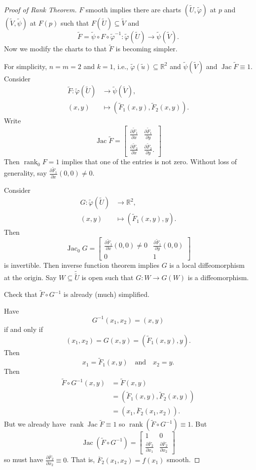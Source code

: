 \documentclass[12pt]{article}
\theoremstyle{definition}
\newcommand{\isp}[1]{\quad\text{#1}\quad}
\newcommand{\R}{\mathbb{R}}
\renewcommand{\phi}{\varphi}
\newcommand{\<}{\left\langle}
\renewcommand{\>}{\right\rangle}
\newcommand{\seq}{\subseteq}
\newcommand{\To}{\longrightarrow}
\newcommand{\Mapsto}{\longmapsto}
\DeclareMathOperator{\rank}{rank}
\DeclareMathOperator{\Jac}{Jac}
\newcommand{\pdv}[2]{\frac{\partial #1}{\partial #2}}
\newcommand{\mat}[1]{\begin{bmatrix}#1\end{bmatrix}}
\renewcommand{\tilde}{\widetilde}
\begin{document}
\begin{proof}[Proof of Rank Theorem]
    $F$ smooth implies there are charts $(\tilde{U}, \tilde{\phi})$ at $p$ and $(\tilde{V}, \tilde{\psi})$ at $F(p)$ such that $F(\tilde{U}) \seq \tilde{V}$ and
    \[
        \tilde{F} = \tilde{\psi} \circ F \circ \tilde{\phi}^{-1} : \tilde{\phi}(\tilde{U}) \To \tilde{\psi}(\tilde{V}).
    \]
    Now we modify the charts to that $\tilde{F}$ is becoming simpler.

    For simplicity, $n = m = 2$ and $k = 1$, i.e., $\tilde{\phi}(\tilde{u}) \seq \R^2$ and $\tilde{\psi}(\tilde{V})$ and $\Jac\tilde{F} \equiv 1$.
    Consider
    \begin{align*}
        \tilde{F} : \tilde{\phi}(\tilde{U}) &\To \tilde{\psi}(\tilde{V}), \\
            (x, y) &\Mapsto (\tilde{F}_1(x, y), \tilde{F}_2(x, y)).
    \end{align*}
    Write
    \[
        \Jac\tilde{F} = \mat{
            \pdv{\tilde{F}_1}{x} & \pdv{\tilde{F}_1}{y} \\
            \pdv{\tilde{F}_2}{x} & \pdv{\tilde{F}_2}{y}.
        }
    \]
    Then $\rank_0 F = 1$ implies that one of the entries is not zero.
    Without loss of generality, say $\pdv{\tilde{F}_1}{x}(0, 0) \ne 0$.

    Consider
    \begin{align*}
        G : \tilde{\phi}(\tilde{U}) &\To \R^2, \\
            (x, y) &\Mapsto (\tilde{F}_1(x, y), y).
    \end{align*}
    Then
    \[
        \Jac_0 G = \mat{
            \pdv{\tilde{F}_1}{x}(0, 0) \ne 0 & \pdv{\tilde{F}_1}{y}(0, 0) \\
            0 & 1
        }
    \]
    is invertible.
    Then inverse function theorem implies $G$ is a local diffeomorphism at the origin.
    Say $W \seq \tilde{\tilde{U}}$ is open such that $G : W \to G(W)$ is a diffeomorphism.

    Check that $\tilde{F} \circ G^{-1}$ is already (much) simplified.

    Have
    \[
        G^{-1}(x_1, x_2) = (x, y)
    \]
    if and only if
    \[
        (x_1, x_2)
            = G(x, y)
            = (\tilde{F}_1(x, y), y).
    \]
    Then 
    \[
        x_1 = \tilde{F}_1(x, y)
        \isp{and}
        x_2 = y.
    \]
    Then
    \begin{align*}
        \tilde{F} \circ G^{-1}(x, y)
            &= \tilde{F}(x, y) \\
            &= (\tilde{F}_1(x, y), \tilde{F}_2(x, y)) \\
            &= (x_1, \overline{F}_2(x_1, x_2)).
    \end{align*}
    But we already have $\rank\Jac\tilde{F} \equiv 1$ so $\rank(\tilde{F} \circ G^{-1}) \equiv 1$.
    But
    \[
        \Jac(\tilde{F} \circ G^{-1}) = \mat{
            1 & 0 \\
            \pdv{\overline{F}_2}{x_1} & \pdv{\overline{F}_2}{x_2}
        }
    \]
    so must have $\pdv{\overline{F}_2}{x_2} \equiv 0$.
    That is, $\overline{F}_2(x_1, x_2) = f(x_1)$ smooth.


\end{proof}
\end{document}
